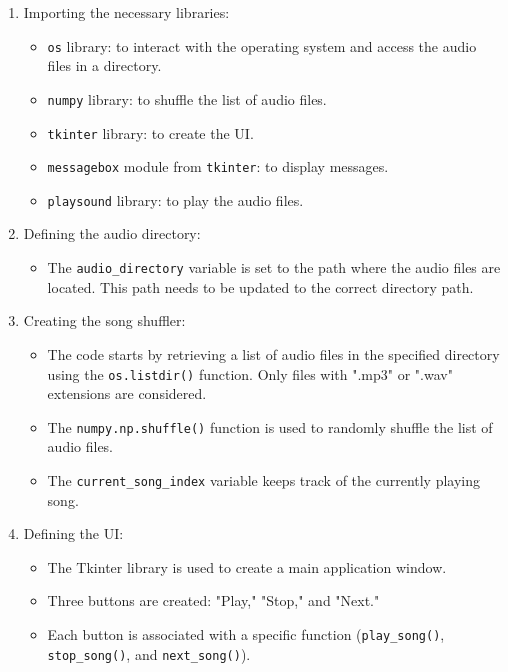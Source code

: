 \documentclass{article}
\begin{document}
\begin{enumerate}
  \item Importing the necessary libraries:
    \begin{itemize}
      \item \texttt{os} library: to interact with the operating system and access the audio files in a directory.
      \item \texttt{numpy} library: to shuffle the list of audio files.
      \item \texttt{tkinter} library: to create the UI.
      \item \texttt{messagebox} module from \texttt{tkinter}: to display messages.
      \item \texttt{playsound} library: to play the audio files.
    \end{itemize}
  
  \item Defining the audio directory:
    \begin{itemize}
      \item The \texttt{audio\_directory} variable is set to the path where the audio files are located. This path needs to be updated to the correct directory path.
    \end{itemize}
  
  \item Creating the song shuffler:
    \begin{itemize}
      \item The code starts by retrieving a list of audio files in the specified directory using the \texttt{os.listdir()} function. Only files with ".mp3" or ".wav" extensions are considered.
      \item The \texttt{numpy.np.shuffle()} function is used to randomly shuffle the list of audio files.
      \item The \texttt{current\_song\_index} variable keeps track of the currently playing song.
    \end{itemize}
  
  \item Defining the UI:
    \begin{itemize}
      \item The Tkinter library is used to create a main application window.
      \item Three buttons are created: "Play," "Stop," and "Next."
      \item Each button is associated with a specific function (\texttt{play\_song()}, \texttt{stop\_song()}, and \texttt{next\_song()}).
    \end{itemize}
  

\end{enumerate}
\end{document}
